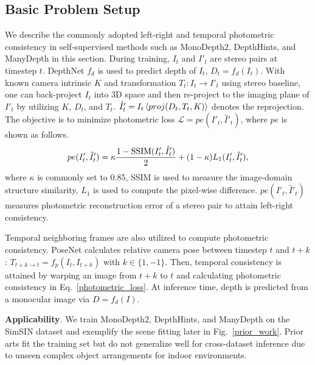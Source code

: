 \documentclass[10pt,twocolumn,letterpaper]{article}
\begin{document}
\subsection{Basic Problem Setup}
\label{sec:setup}
We describe the commonly adopted left-right and temporal photometric consistency in self-supervised methods such as MonoDepth2, DepthHints, and ManyDepth in this section.
During training, $I_t$ and $I'_t$ are stereo pairs at timestep $t$. DepthNet $f_d$ is used to predict depth of $I_t$, $D_t = f_d(I_t)$. With known camera intrinsic $K$ and transformation $T_t: I_t \to I'_t$ using stereo baseline, one can back-project $I_t$ into 3D space and then re-project to the imaging plane of $I'_t$ by utilizing $K$, $D_t$, and $T_t$. $\hat{I}'_t = I_t \braket{proj(D_t, T_t, K)}$ denotes the reprojection. The objective is to minimize photometric loss $\mathcal{L}= pe(I'_t, \hat{I}'_t)$, where $pe$ is shown as follows.
\begin{equation}
    \vspace{-4pt}
     pe(I'_t, \hat{I}'_t) = \kappa \frac{1-\text{SSIM}(I'_t, \hat{I}'_t)}{2} + (1-\kappa)L_1(I'_t, \hat{I}'_t),
     \vspace{-3pt}
\label{photometric_loss}
\end{equation}
where $\kappa$ is commonly set to 0.85, SSIM \cite{wang2004image} is used to measure the image-domain structure similarity, $L_1$ is used to compute the pixel-wise difference. $pe(I'_t, \hat{I}'_t)$ measures photometric reconstruction error of a stereo pair to attain left-right consistency.

Temporal neighboring frames are also utilized to compute photometric consistency. PoseNet calculates relative camera pose between timestep $t$ and $t+k$: $T_{t+k\to t}=f_p(I_t, I_{t+k})$ with $k \in \{1,-1\}$. Then, temporal consistency is attained by warping an image from $t+k$ to $t$ and calculating photometric consistency in Eq.~\ref{photometric_loss}. At inference time, depth is predicted from a monocular image via $D=f_d({I})$.

\textbf{Applicability}. We train MonoDepth2, DepthHints, and ManyDepth on the SimSIN dataset and exemplify the scene fitting later in Fig.~\ref{prior_work}. Prior arts fit the training set but do not generalize well for cross-dataset inference due to unseen complex object arrangements for indoor environments.
\end{document}
